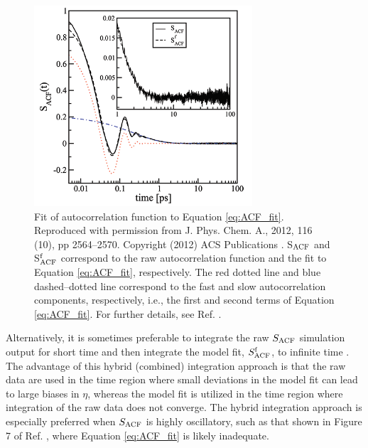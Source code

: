 \documentclass[9pt,bestpractices]{livecoms}
\begin{document}
\begin{figure}[htb!]
	\centering
	\includegraphics[width=3.2in]{FanourgakisFig1.png}
	\caption{Fit of autocorrelation function to Equation \ref{eq:ACF_fit}. Reproduced with permission from J. Phys. Chem. A., 2012, 116 (10), pp 2564--2570. Copyright (2012) ACS Publications \cite{Fanourgakis2012}. S$_{\rm ACF}$ and S$^{\rm f}_{\rm ACF}$ correspond to the raw autocorrelation function and the fit to Equation \ref{eq:ACF_fit}, respectively. The red dotted line and blue dashed--dotted line correspond to the fast and slow autocorrelation components, respectively, i.e., the first and second terms of Equation \ref{eq:ACF_fit}. For further details, see Ref. \cite{Fanourgakis2012}.}
	\label{fig:FanourgakisFig1}
\end{figure}


Alternatively, it is sometimes preferable to integrate the raw $S_{\rm ACF}$ simulation output for short time and then integrate the model fit, $S^{\rm f}_{\rm ACF}$, to infinite time \cite{vanderSpoel1998,Shirts2013,Fernandez2005}. The advantage of this hybrid (combined) integration approach is that the raw data are used in the time region where small deviations in the model fit can lead to large biases in $\eta$, whereas the model fit is utilized in the time region where integration of the raw data does not converge. The hybrid integration approach is especially preferred when $S_{\rm ACF}$ is highly oscillatory, such as that shown in Figure 7 of Ref. \cite{Fernandez2005}, where Equation \ref{eq:ACF_fit} is likely inadequate. 
\end{document}
